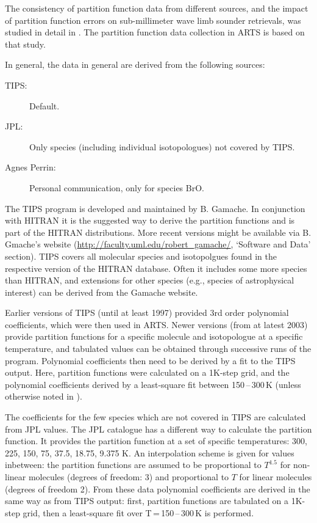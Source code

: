 The consistency of partition function data from different sources, and
the impact of partition function errors on sub-millimeter wave limb
sounder retrievals, was studied in detail in \citet{cverdes:05}. The
partition function data collection in ARTS is based on that study.

In general, the data in general are derived from the following sources:
\begin{description}
\item[TIPS:] Default.
\item[JPL:] Only species (including individual isotopologues) not covered by TIPS.
\item[Agnes Perrin:] Personal communication, only for species BrO.
\end{description}

The TIPS program is developed and maintained by B. Gamache. In conjunction
with HITRAN it is the suggested way to derive the partition functions and is
part of the HITRAN distributions. More recent versions might be available via B.
Gmache's website (\url{http://faculty.uml.edu/robert_gamache/}, `Software and
Data' section). TIPS covers all molecular species and isotopolgues found in the
respective version of the HITRAN database. Often it includes some more species
than HITRAN, and extensions for other species (e.g., species of astrophysical
interest) can be derived from the Gamache website.

Earlier versions of TIPS (until at least 1997) provided 3rd order polynomial
coefficients, which were then used in ARTS.
Newer versions (from at latest 2003) provide partition
functions for a specific molecule and isotopologue at a specific temperature,
and tabulated values can be obtained through successive runs of the program.
Polynomial coefficients then need to be derived by a fit to the TIPS output.
Here, partition functions were calculated on a 1K-step grid, and the polynomial
coefficients derived by a least-square fit between 150\,--\,300\,K (unless
otherwise noted in ).

The coefficients for the few species which are not covered in
TIPS are calculated from JPL values. The JPL catalogue has a
different way to calculate the partition function. It provides the
partition function at a set of specific temperatures: 300, 225, 150, 75, 37.5,
18.75, 9.375 K. An interpolation scheme is given for values
inbetween: the partition functions are assumed to be proportional to $T^{1.5}$
for non-linear molecules (degrees of freedom: 3) and proportional to $T$ for
linear molecules (degrees of freedom 2).
From these data polynomial coefficients are derived in the same way as from TIPS
output: first, partition functions are tabulated on a 1K-step grid, then a
least-square fit over T\,=\,150\,--\,300\,K is performed.

